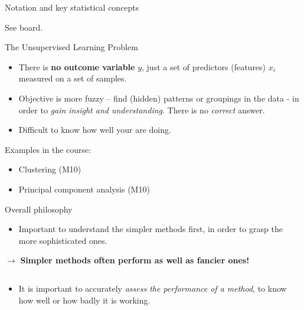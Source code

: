 \documentclass[ignorenonframetext,]{beamer}
\providecommand{\tightlist}{%
  \setlength{\itemsep}{0pt}\setlength{\parskip}{0pt}}
\begin{document}
\begin{frame}{Notation and key statistical concepts}
\protect\hypertarget{notation-and-key-statistical-concepts}{}

See board.

\end{frame}

\begin{frame}{The Unsupervised Learning Problem}
\protect\hypertarget{the-unsupervised-learning-problem}{}

\begin{itemize}
\item
  There is \textbf{no outcome variable} \(y\), just a set of predictors
  (features) \(x_i\) measured on a set of samples.
\item
  Objective is more fuzzy -- find (hidden) patterns or groupings in the
  data - in order to \emph{gain insight and understanding}. There is no
  \emph{correct} answer.
\item
  Difficult to know how well your are doing.
\end{itemize}

Examples in the course:

\begin{itemize}
\tightlist
\item
  Clustering (M10)
\item
  Principal component analysis (M10)
\end{itemize}

\end{frame}

\begin{frame}{Overall philosophy}
\protect\hypertarget{overall-philosophy}{}

\begin{itemize}
\tightlist
\item
  Important to understand the simpler methods first, in order to grasp
  the more sophisticated ones.
\end{itemize}

\(\rightarrow\) \textbf{Simpler methods often perform as well as fancier
ones!}

\(~\)

\begin{itemize}
\tightlist
\item
  It is important to accurately \emph{assess the performance of a
  method}, to know how well or how badly it is working.
\end{itemize}

\end{frame}
\end{document}
